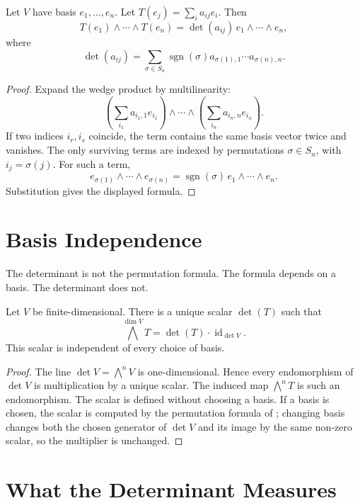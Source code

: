\documentclass[11pt]{memoir}
\newcommand{\id}{\operatorname{id}}
\begin{document}
Let \(V\) have basis \(e_1,\dots,e_n\). Let \(T(e_j)=\sum_i a_{ij}e_i\).
Then
\[
  T(e_1)\wedge\cdots\wedge T(e_n)
  =
  \det(a_{ij})\,e_1\wedge\cdots\wedge e_n,
\]
where
\[
  \det(a_{ij})
  =
  \sum_{\sigma\in S_n}\operatorname{sgn}(\sigma)
  a_{\sigma(1),1}\cdots a_{\sigma(n),n}.
\]

\begin{proof}
Expand the wedge product by multilinearity:
\[
  \left(\sum_{i_1}a_{i_1,1}e_{i_1}\right)\wedge\cdots\wedge
  \left(\sum_{i_n}a_{i_n,n}e_{i_n}\right).
\]
If two indices \(i_r,i_s\) coincide, the term contains the same basis
vector twice and vanishes. The only surviving terms are indexed by
permutations \(\sigma\in S_n\), with \(i_j=\sigma(j)\). For such a
term,
\[
  e_{\sigma(1)}\wedge\cdots\wedge e_{\sigma(n)}
  =
  \operatorname{sgn}(\sigma)\,e_1\wedge\cdots\wedge e_n.
\]
Substitution gives the displayed formula.
\end{proof}

\section{Basis Independence}
\label{sec:basis-independence}

The determinant is not the permutation formula. The formula depends on
a basis. The determinant does not.

\begin{proposition}
\label{prop:basis-free-det}
Let \(V\) be finite-dimensional. There is a unique scalar \(\det(T)\)
such that
\[
  \bigwedge^{\dim V}T=\det(T)\cdot\id_{\det V}.
\]
This scalar is independent of every choice of basis.
\end{proposition}

\begin{proof}
The line \(\det V=\bigwedge^{n}V\) is one-dimensional. Hence every
endomorphism of \(\det V\) is multiplication by a unique scalar.
The induced map \(\bigwedge^n T\) is such an endomorphism. The scalar
is defined without choosing a basis. If a basis is chosen, the scalar
is computed by the permutation formula of
; changing basis changes both the chosen
generator of \(\det V\) and its image by the same non-zero scalar, so
the multiplier is unchanged.
\end{proof}

\section{What the Determinant Measures}
\label{sec:what-det-measures}
\end{document}
